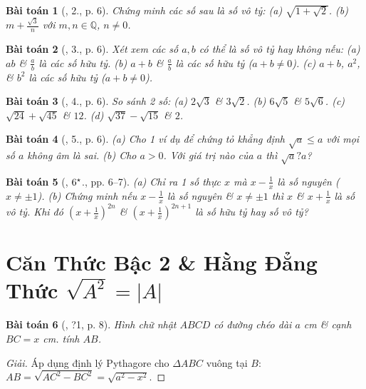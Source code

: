 \documentclass{article}
\newtheorem{baitoan}{Bài toán}
\begin{document}
\begin{baitoan}[\cite{Binh_Toan_9_tap_1}, 2., p. 6]
	Chứng minh các số sau là số vô tỷ: (a) $\sqrt{1 + \sqrt{2}}$. (b) $m + \frac{\sqrt{3}}{n}$ với $m,n\in\mathbb{Q}$, $n\ne0$.
\end{baitoan}

\begin{baitoan}[\cite{Binh_Toan_9_tap_1}, 3., p. 6]
	Xét xem các số $a,b$ có thể là số vô tỷ hay không nếu: (a) $ab$ \& $\frac{a}{b}$ là các số hữu tỷ. (b) $a + b$ \& $\frac{a}{b}$ là các số hữu tỷ ($a + b\ne0$). (c) $a + b$, $a^2$, \& $b^2$ là các số hữu tỷ ($a + b\ne0$).
\end{baitoan}

\begin{baitoan}[\cite{Binh_Toan_9_tap_1}, 4., p. 6]
	So sánh 2 số: (a) $2\sqrt{3}$ \& $3\sqrt{2}$. (b) $6\sqrt{5}$ \& $5\sqrt{6}$. (c) $\sqrt{24} + \sqrt{45}$ \& $12$. (d) $\sqrt{37} - \sqrt{15}$ \& $2$.
\end{baitoan}

\begin{baitoan}[\cite{Binh_Toan_9_tap_1}, 5., p. 6]
	(a) Cho 1 ví dụ để chứng tỏ khẳng định $\sqrt{a}\le a$ với mọi số $a$ không âm là sai. (b) Cho $a > 0$. Với giá trị nào của $a$ thì $\sqrt{a} ? a$?
\end{baitoan}

\begin{baitoan}[\cite{Binh_Toan_9_tap_1}, $\rm6^\star$., pp. 6--7]
	(a) Chỉ ra 1 số thực $x$ mà $x - \frac{1}{x}$ là số nguyên ($x\ne\pm1$). (b) Chứng minh nếu $x - \frac{1}{x}$ là số nguyên \& $x\ne\pm1$ thì $x$ \& $x + \frac{1}{x}$ là số vô tỷ. Khi đó $\left(x + \frac{1}{x}\right)^{2n}$ \& $\left(x + \frac{1}{x}\right)^{2n+1}$ là số hữu tỷ hay số vô tỷ?
\end{baitoan}


\section{Căn Thức Bậc 2 \& Hằng Đẳng Thức $\sqrt{A^2} = |A|$}

\begin{baitoan}[\cite{SGK_Toan_9_tap_1}, ?1, p. 8]
	Hình chữ nhật $ABCD$ có đường chéo dài $a$ {\rm cm} \& cạnh $BC = x$ {\rm cm}. tính $AB$.
\end{baitoan}

\begin{proof}[Giải]
	Áp dụng định lý Pythagore cho $\Delta ABC$ vuông tại $B$: $AB = \sqrt{AC^2 - BC^2} = \sqrt{a^2 - x^2}$.
\end{proof}
\end{document}
